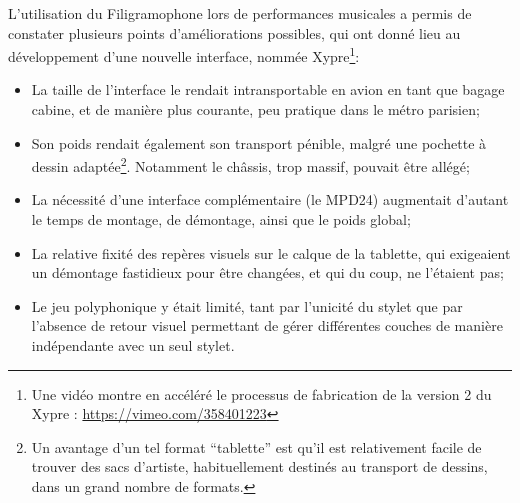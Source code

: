 
\noindent L'utilisation du Filigramophone lors de performances musicales a permis de constater plusieurs points d'améliorations possibles, qui ont donné lieu au développement d'une nouvelle interface, nommée Xypre\footnote{Une vidéo montre en accéléré le processus de fabrication de la version 2 du Xypre : \url{https://vimeo.com/358401223}}:
\vspace{-1em}
\begin{itemize}[noitemsep]
	\item La taille de l'interface le rendait intransportable en avion en tant que bagage cabine, et de manière plus courante, peu pratique dans le métro parisien;
	\item Son poids rendait également son transport pénible, malgré une pochette à dessin adaptée\footnote{Un avantage d'un tel format ``tablette'' est qu'il est relativement facile de trouver des sacs d'artiste, habituellement destinés au transport de dessins, dans un grand nombre de formats.}. Notamment le châssis, trop massif, pouvait être allégé;
	\item La nécessité d'une interface complémentaire (le MPD24) augmentait d'autant le temps de montage, de démontage, ainsi que le poids global;
	\item La relative fixité des repères visuels sur le calque de la tablette, qui exigeaient un démontage fastidieux pour être changées, et qui du coup, ne l'étaient pas;
	\item Le jeu polyphonique y était limité, tant par l'unicité du stylet que par l'absence de retour visuel permettant de gérer différentes couches de manière indépendante avec un seul stylet.
\end{itemize}

